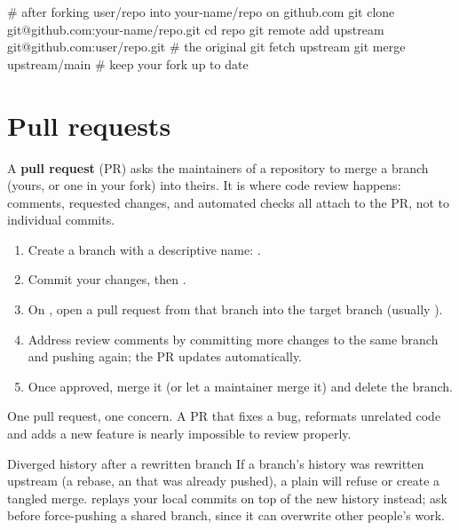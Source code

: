 \begin{shcode}
# after forking user/repo into your-name/repo on github.com
git clone git@github.com:your-name/repo.git
cd repo
git remote add upstream git@github.com:user/repo.git   # the original
git fetch upstream
git merge upstream/main        # keep your fork up to date
\end{shcode}

\section{Pull requests}

A \textbf{pull request} (PR) asks the maintainers of a repository to
merge a branch (yours, or one in your fork) into theirs. It is where
code review happens: comments, requested changes, and automated checks
all attach to the PR, not to individual commits.

\begin{enumerate}
  \item Create a branch with a descriptive name:
        .
  \item Commit your changes, then .
  \item On \GitHub{}, open a pull request from that branch into the
        target branch (usually ).
  \item Address review comments by committing more changes to the same
        branch and pushing again; the PR updates automatically.
  \item Once approved, merge it (or let a maintainer merge it) and
        delete the branch.
\end{enumerate}

\begin{ruleofthumb}
One pull request, one concern. A PR that fixes a bug, reformats
unrelated code and adds a new feature is nearly impossible to review
properly.
\end{ruleofthumb}

\begin{gotcha}{Diverged history after a rewritten branch}
If a branch's history was rewritten upstream (a rebase, an
 that was already pushed), a plain  will
refuse or create a tangled merge.  replays your
local commits on top of the new history instead; ask before force-pushing
a shared branch, since it can overwrite other people's work.
\end{gotcha}


